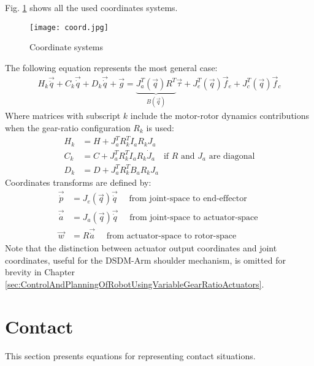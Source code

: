 Fig. \ref{fig:coord} shows all the used coordinates systems. 
%
\begin{figure}[t]
	\centering
		\texttt{[image: coord.jpg]}
	\caption{Coordinate systems}
	\label{fig:coord}
\end{figure}
%
The following equation represents the most general case:
%
\begin{align}
H_k \vec{\ddot{q}} + C_k \vec{\dot{q}} + D_k \vec{\dot{q}} + \vec{g} =  \underbrace{ J_a^T(\vec{q}) R^T }_{B(\vec{q})}  \vec{\tau} + J_e^T(\vec{q}) \vec{f}_e + J_c^T(\vec{q}) \vec{f}_c
\label{eq:manipulator_gen}
\end{align}
%
Where matrices with subscript $k$ include the motor-rotor dynamics contributions when the gear-ratio configuration $R_k$ is used:
%
\begin{align}
H_k   &= H + J_a^T R_k^T I_a R_k J_a        \\
C_k   &= C + J_a^T R_k^T I_a R_k \dot{J}_a \quad \text{if $R$ and $J_a$ are diagonal} \\
D_k   &= D + J_a^T R_k^T B_a R_k J_a 
\label{eq:coord_transform}
\end{align}
%
Coordinates transforms are defined by:
%
\begin{align}
\vec{\dot{p}}   &= J_e( \vec{q} ) \vec{\dot{q} }  \quad \text{ from joint-space to end-effector   } \\
\vec{\dot{a}}   &= J_a( \vec{q} ) \vec{\dot{q} }  \quad \text{ from joint-space to actuator-space } \\
\vec{w }        &= R              \vec{\dot{a} }  \quad \text{ from actuator-space to rotor-space } 
\label{eq:coord_transform2}
\end{align}
%
Note that the distinction between actuator output coordinates and joint coordinates, useful for the DSDM-Arm shoulder mechanism, is omitted for brevity in Chapter \ref{sec:ControlAndPlanningOfRobotUsingVariableGearRatioActuators}. 

\section{Contact}
\label{sec:contact}

This section presents equations for representing contact situations.

